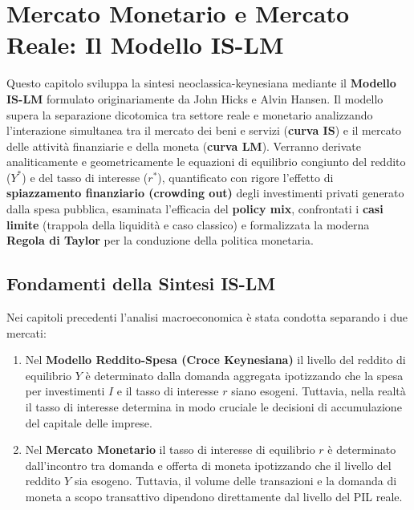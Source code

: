 \chapter{Mercato Monetario e Mercato Reale: Il Modello IS-LM}
\label{chap:mercato_monetario_reale_is_lm}

\begin{tcolorbox}[colback=navyblue!5!white, colframe=navyblue, title=\textbf{Quadro Concettuale del Capitolo}]
Questo capitolo sviluppa la sintesi neoclassica-keynesiana mediante il \textbf{Modello IS-LM} formulato originariamente da John Hicks e Alvin Hansen. Il modello supera la separazione dicotomica tra settore reale e monetario analizzando l'interazione simultanea tra il mercato dei beni e servizi (\textbf{curva IS}) e il mercato delle attività finanziarie e della moneta (\textbf{curva LM}). Verranno derivate analiticamente e geometricamente le equazioni di equilibrio congiunto del reddito ($Y^*$) e del tasso di interesse ($r^*$), quantificato con rigore l'effetto di \textbf{spiazzamento finanziario (crowding out)} degli investimenti privati generato dalla spesa pubblica, esaminata l'efficacia del \textbf{policy mix}, confrontati i \textbf{casi limite} (trappola della liquidità e caso classico) e formalizzata la moderna \textbf{Regola di Taylor} per la conduzione della politica monetaria.
\end{tcolorbox}

\section{Fondamenti della Sintesi IS-LM}

Nei capitoli precedenti l'analisi macroeconomica è stata condotta separando i due mercati:
\begin{enumerate}
    \item Nel \textbf{Modello Reddito-Spesa (Croce Keynesiana)} il livello del reddito di equilibrio $Y$ è determinato dalla domanda aggregata ipotizzando che la spesa per investimenti $I$ e il tasso di interesse $r$ siano esogeni. Tuttavia, nella realtà il tasso di interesse determina in modo cruciale le decisioni di accumulazione del capitale delle imprese.
    \item Nel \textbf{Mercato Monetario} il tasso di interesse di equilibrio $r$ è determinato dall'incontro tra domanda e offerta di moneta ipotizzando che il livello del reddito $Y$ sia esogeno. Tuttavia, il volume delle transazioni e la domanda di moneta a scopo transattivo dipendono direttamente dal livello del PIL reale.
\end{enumerate}

